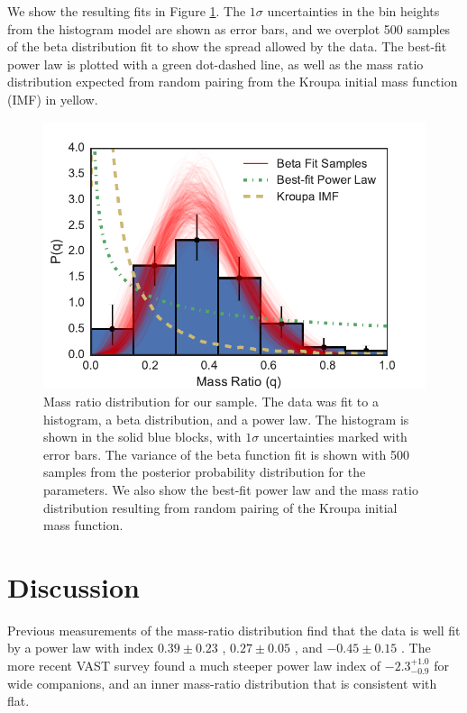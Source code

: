 \documentclass{emulateapj}
\begin{document}
We show the resulting fits in Figure \ref{fig:mrd}. The $1\sigma$ uncertainties in the bin heights from the histogram model are shown as error bars, and we overplot 500 samples of the beta distribution fit to show the spread allowed by the data. The best-fit power law is plotted with a green dot-dashed line, as well as the mass ratio distribution expected from random pairing from the Kroupa initial mass function (IMF) in yellow.


\begin{figure}
\includegraphics[width=\columnwidth]{MRD_total.pdf}
\caption{Mass ratio distribution for our sample. The data was fit to a histogram, a beta distribution, and a power law. The histogram is shown in the solid blue blocks, with $1 \sigma$ uncertainties marked with error bars. The variance of the beta function fit is shown with 500 samples from the posterior probability distribution for the parameters. We also show the best-fit power law and the mass ratio distribution resulting from random pairing of the Kroupa initial mass function.}
\label{fig:mrd}
\end{figure}




\section{Discussion}
\label{sec:discussion}

Previous measurements of the mass-ratio distribution find that the data is well fit by a power law with index $0.39 \pm 0.23$ \citep[M dwarf stars][]{Delfosse2004}, $0.27 \pm 0.05$ \citep[Solar type stars][]{Duchene2013}, and $-0.45 \pm 0.15$ \citep[intermediate-mass stars][]{Kouwenhoven2007}. The more recent VAST survey found a much steeper power law index of $-2.3^{+1.0}_{-0.9}$ for wide companions, and an inner mass-ratio distribution that is consistent with flat.
\end{document}
